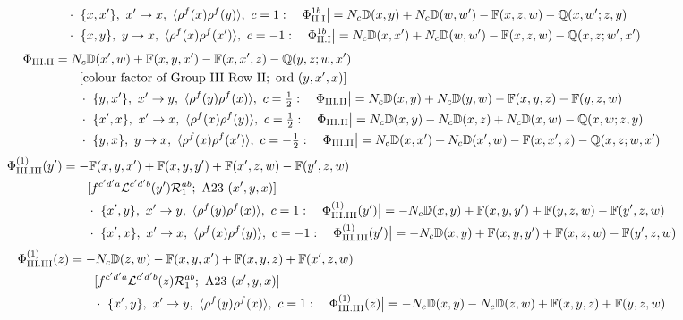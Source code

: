 \documentclass[9pt]{article}
\def\mf#1{\mathbb{#1}}
\numberwithin{equation}{section}
\begin{document}
{\begin{align}
&\qquad\cdot\ \{x,x'\},\ x'\to x,\ \langle\rho^{f}(x)\rho^{f}(y)\rangle,\ c=1:\quad \Phi_{\rm II.I}^{1b}\big|=N_{c}\mf{D}(x,y)+N_{c}\mf{D}(w,w')-\mf{F}(x,z,w)-\mf{Q}(x,w';z,y)\notag\\
&\qquad\cdot\ \{x,y\},\ y\to x,\ \langle\rho^{f}(x)\rho^{f}(x')\rangle,\ c=-1:\quad \Phi_{\rm II.I}^{1b}\big|=N_{c}\mf{D}(x,x')+N_{c}\mf{D}(w,w')-\mf{F}(x,z,w)-\mf{Q}(x,z;w',x')\notag
\end{align}
\begin{align}
\Phi_{\rm III.II}&=N_{c}\mf{D}(x',w)+\mf{F}(x,y,x')-\mf{F}(x,x',z)-\mf{Q}(y,z;w,x')\notag\\&\qquad[\text{colour factor of Group III Row II};\ \text{ord}\ (y,x',x)]\notag\\
&\qquad\cdot\ \{y,x'\},\ x'\to y,\ \langle\rho^{f}(y)\rho^{f}(x)\rangle,\ c=\tfrac{1}{2}:\quad \Phi_{\rm III.II}\big|=N_{c}\mf{D}(x,y)+N_{c}\mf{D}(y,w)-\mf{F}(x,y,z)-\mf{F}(y,z,w)\notag\\
&\qquad\cdot\ \{x',x\},\ x'\to x,\ \langle\rho^{f}(x)\rho^{f}(y)\rangle,\ c=\tfrac{1}{2}:\quad \Phi_{\rm III.II}\big|=N_{c}\mf{D}(x,y)-N_{c}\mf{D}(x,z)+N_{c}\mf{D}(x,w)-\mf{Q}(x,w;z,y)\notag\\
&\qquad\cdot\ \{y,x\},\ y\to x,\ \langle\rho^{f}(x)\rho^{f}(x')\rangle,\ c=-\tfrac{1}{2}:\quad \Phi_{\rm III.II}\big|=N_{c}\mf{D}(x,x')+N_{c}\mf{D}(x',w)-\mf{F}(x,x',z)-\mf{Q}(x,z;w,x')\notag
\end{align}
\begin{align}
\Phi_{\rm III.III}^{(1)}(y')&=-\mf{F}(x,y,x')+\mf{F}(x,y,y')+\mf{F}(x',z,w)-\mf{F}(y',z,w)\notag\\&\qquad[f^{c'd'a}\mathcal{L}^{c'd'b}(y')\mathcal{R}_{1}^{ab};\ \text{A23}\ (x',y,x)]\notag\\
&\qquad\cdot\ \{x',y\},\ x'\to y,\ \langle\rho^{f}(y)\rho^{f}(x)\rangle,\ c=1:\quad \Phi_{\rm III.III}^{(1)}(y')\big|=-N_{c}\mf{D}(x,y)+\mf{F}(x,y,y')+\mf{F}(y,z,w)-\mf{F}(y',z,w)\notag\\
&\qquad\cdot\ \{x',x\},\ x'\to x,\ \langle\rho^{f}(x)\rho^{f}(y)\rangle,\ c=-1:\quad \Phi_{\rm III.III}^{(1)}(y')\big|=-N_{c}\mf{D}(x,y)+\mf{F}(x,y,y')+\mf{F}(x,z,w)-\mf{F}(y',z,w)\notag
\end{align}
\begin{align}
\Phi_{\rm III.III}^{(1)}(z)&=-N_{c}\mf{D}(z,w)-\mf{F}(x,y,x')+\mf{F}(x,y,z)+\mf{F}(x',z,w)\notag\\&\qquad[f^{c'd'a}\mathcal{L}^{c'd'b}(z)\mathcal{R}_{1}^{ab};\ \text{A23}\ (x',y,x)]\notag\\
&\qquad\cdot\ \{x',y\},\ x'\to y,\ \langle\rho^{f}(y)\rho^{f}(x)\rangle,\ c=1:\quad \Phi_{\rm III.III}^{(1)}(z)\big|=-N_{c}\mf{D}(x,y)-N_{c}\mf{D}(z,w)+\mf{F}(x,y,z)+\mf{F}(y,z,w)\notag\\

\end{align}}
\end{document}
